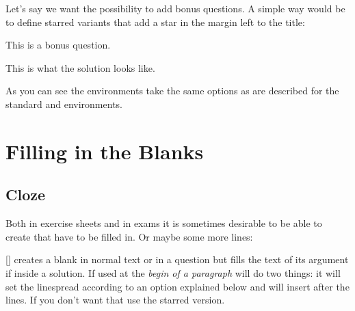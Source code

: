 \documentclass[load-preamble+,scrartcl={DIV10}]{cnltx-doc}
\DeclareRobustCommand*\questionstar{\texorpdfstring{\bonusquestionsign}{* }}
\DeclareRobustCommand*\bonusquestionsign{\llap{$\bigstar$\space}}
\begin{document}
Let's say we want the possibility to add bonus questions.  A simple way would
be to define starred variants that add a star in the margin left to the title:
\begin{example}
  \begin{question*}
    This is a bonus question.
  \end{question*}
  \begin{solution*}[print]
    This is what the solution looks like.
  \end{solution*}
\end{example}
As you can see the environments take the same options as are described for the
standard  and  environments.

\section{Filling in the Blanks}
\subsection{Cloze}
\noindent{}Both in exercise sheets and in exams it is
sometimes desirable to be able to create  that have to be filled
in.  Or maybe some more lines: \blank[width=5\linewidth]{}

\begin{commands}
  [\sarg{}]
    creates a blank in normal text or in a question but fills the text of its
    argument if inside a solution.  If used at the \emph{begin of a paragraph}
     will do two things: it will set the linespread according to an
    option explained below and will insert  after the lines.  If you
    don't want that use the starred version.
\end{commands}
\end{document}
